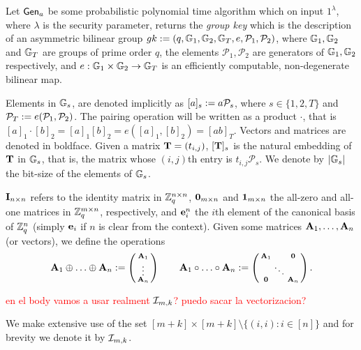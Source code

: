 Let $\mathsf{Gen}_a$ be some probabilistic polynomial time algorithm which on input $1^{\lambda}$, where $\lambda$ is the security parameter, returns the \emph{group key} which is the description of an asymmetric bilinear group $gk:=(q,\mathbb{G}_1,\mathbb{G}_2,\mathbb{G}_T,e,\mathcal{P}_1,\mathcal{P}_2)$, where $\mathbb{G}_1,\mathbb{G}_2$
and $\mathbb{G}_T$ are groups of prime order $q$, the elements $\mathcal{P}_1, \mathcal{P}_2$ are generators of 
$\mathbb{G}_1,\mathbb{G}_2$ respectively, and $e:\mathbb{G}_1\times\mathbb{G}_2\to\mathbb{G}_T$ is an efficiently
computable, non-degenerate bilinear map. 

Elements in $\mathbb{G}_s$, are denoted implicitly as $[a]_s:=a \mathcal{P}_s$, where $s \in \{1,2,T\}$ and $\mathcal{P}_T:=e(\mathcal{P}_1,\mathcal{P}_2)$. 
The pairing operation will be written as a product $\cdot$, that is $[a]_1 \cdot [b]_2=[a]_1 [b]_2=e([a]_1,[b]_2)=[ab]_T$. Vectors and matrices are denoted in boldface. Given a matrix $\mathbf{{T}}=(t_{i,j})$, $[\mathbf{{T}}]_s$ is
the natural embedding of $\mathbf{{T}}$ in $\mathbb{G}_s$, that is, the matrix whose $(i,j)$th entry
is $t_{i,j}\mathcal{P}_s$. We denote by $|\mathbb{G}_s|$ the bit-size of the elements of $\mathbb{G}_s$.

$\mathbf{{I}}_{n\times n}$ refers to the identity matrix in $\mathbb{Z}_q^{n\times n}$, $\mathbf{{0}}_{m\times n}$ and $\mathbf{{1}}_{m\times n}$ the all-zero and all-one matrices in $\mathbb{Z}_q^{m\times n}$, respectively, and $\mathbf{e}^{n}_i$ the $i$th element 
of the canonical basis of $\mathbb{Z}_q^{n}$ (simply $\mathbf{e}_i$ if $n$ is clear from the context). 
Given some matrices $\mathbf{{A}}_1,\ldots,\mathbf{{A}}_n$ (or vectors), we define the operations $$\mathbf{A}_1 \oplus \ldots \oplus \mathbf{A}_n:=\left(\begin{smallmatrix} \mathbf{A}_1 \\ \vdots \\  \mathbf{A}_n\end{smallmatrix}\right) \qquad 
\mathbf{{A}}_1 \circ \ldots \circ \mathbf{{A}}_n:=\left(\begin{smallmatrix} \mathbf{{A}}_1 &  & \mathbf{{0}} \\   & \ddots &   \\ \mathbf{{0}} &  & \mathbf{{A}}_n
\end{smallmatrix}\right).$$ 



\textcolor{red}{en el body vamos a usar realment $\mathcal{I}_{m,k}$?}
\textcolor{red}{puedo sacar la vectorizacion?}

We make extensive use of the set $[m+k]\times[m+k]\setminus\{(i,i):i\in[n]\}$ and for brevity we denote it by $\mathcal{I}_{m,k}$.

